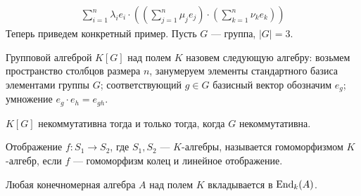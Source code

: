 \begin{ex}
\begin{enumerate}[noitemsep]
\[\begin{aligned}
		 \sum_{i=1}^{n} \lambda _i e_i  \cdot 
		\left(
	    \left( \sum_{j=1}^{n} \mu_j e_j \right) 
		\cdot 
		\left(\sum_{k=1}^{n} \nu _k e_k \right)
\right)
	    \end{aligned}
	    \]
	    Теперь приведем конкретный пример.
	     Пусть $ G$ --- группа,  $ \lvert G \rvert =3$.
	     \begin{defn}
		 {\sf Групповой алгеброй $ K[G]$} над полем $ K$ назовем следующую алгебру: возьмем пространство столбцов размера   $ n$, занумеруем  элементы стандартного базиса элементами группы $ G$; соответствующий $ g \in G$ базисный  вектор обозначим $ e_g$; умножение  $ e_g \cdot e_h = e_{gh}$.
		 \begin{note}
		     $ K[G]$ некоммутативна тогда и только тогда, когда  $ G$ некоммутативна.
		 \end{note}
	     \end{defn}
    \end{enumerate} 
\end{ex}
\begin{defn}
    Отображение $ f\colon S_1 \to  S_2$, где $ S_1, S_2$ --- $ K$-алгебры, называется  {\sf гомоморфизмом $ K$-алгебр}, если $ f $ --- гомоморфизм колец и линейное отображение.  
\end{defn}
\begin{thm}
    Любая конечномерная алгебра $ A$ над полем $ K$ вкладывается в  $ \operatorname{End}_k(A)$.
\end{thm}


